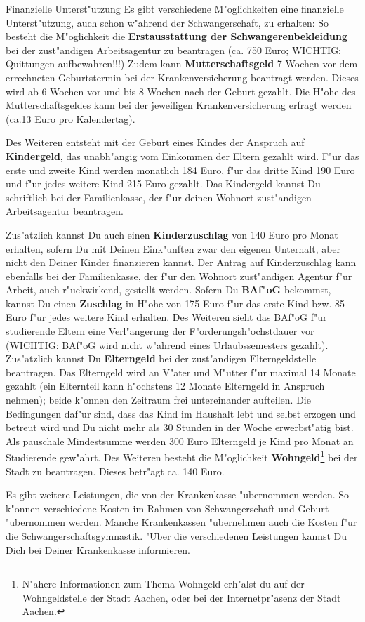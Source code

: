 \begin{artikel}{Finanzielle Unterst"utzung}
Es gibt verschiedene M"oglichkeiten eine finanzielle Unterst"utzung, auch schon w"ahrend der Schwangerschaft, zu erhalten:
So besteht die M"oglichkeit die \textbf{Erstausstattung der Schwangerenbekleidung} bei der zust"andigen Arbeitsagentur zu beantragen (ca. 750 Euro;  WICHTIG: Quittungen aufbewahren!!!)
Zudem kann \textbf{Mutterschaftsgeld} 7 Wochen vor dem errechneten Geburtstermin bei der Krankenversicherung beantragt werden. Dieses wird ab 6 Wochen vor und bis 8 Wochen nach der Geburt gezahlt. Die H"ohe des Mutterschaftsgeldes kann bei der jeweiligen Krankenversicherung erfragt werden (ca.13 Euro pro Kalendertag).

Des Weiteren entsteht  mit der Geburt eines Kindes der Anspruch auf \textbf{Kindergeld}, das unabh"angig vom Einkommen der Eltern gezahlt wird. F"ur das erste und zweite Kind werden monatlich 184 Euro, f"ur das dritte Kind 190 Euro und f"ur jedes weitere Kind 215 Euro gezahlt. Das Kindergeld kannst Du schriftlich bei der Familienkasse, der f"ur deinen Wohnort zust"andigen Arbeitsagentur beantragen.

Zus"atzlich kannst Du auch einen \textbf{Kinderzuschlag} von 140 Euro pro Monat erhalten, sofern Du mit Deinen Eink"unften zwar den eigenen Unterhalt, aber nicht den Deiner Kinder finanzieren kannst. Der Antrag auf Kinderzuschlag kann ebenfalls bei der Familienkasse, der f"ur den Wohnort zust"andigen Agentur f"ur Arbeit, auch r"uckwirkend, gestellt werden.
Sofern Du \textbf{BAf"oG} bekommst, kannst Du einen \textbf{Zuschlag} in H"ohe von 175 Euro f"ur das erste Kind bzw. 85 Euro f"ur jedes weitere Kind erhalten. Des Weiteren sieht das BAf"oG f"ur studierende Eltern eine Verl"angerung der F"orderungsh"ochstdauer vor (WICHTIG: BAf"oG wird nicht w"ahrend eines Urlaubssemesters gezahlt).\\

Zus"atzlich kannst Du \textbf{Elterngeld} bei der zust"andigen Elterngeldstelle beantragen. Das Elterngeld wird an V"ater und M"utter f"ur maximal 14 Monate gezahlt (ein Elternteil kann h"ochstens 12 Monate Elterngeld in Anspruch nehmen); beide k"onnen den Zeitraum frei untereinander aufteilen. Die Bedingungen daf"ur sind, dass das Kind im Haushalt lebt und selbst erzogen und betreut wird und Du nicht mehr als 30 Stunden in der Woche erwerbst"atig bist.  Als pauschale Mindestsumme werden 300 Euro Elterngeld je Kind  pro Monat an Studierende gew"ahrt. 
Des Weiteren besteht die M"oglichkeit \textbf{Wohngeld}\footnote{N"ahere Informationen zum Thema Wohngeld erh"alst du auf der Wohngeldstelle der Stadt Aachen, oder bei der Internetpr"asenz der Stadt  Aachen.} bei der Stadt zu beantragen. Dieses betr"agt ca. 140 Euro.


Es gibt weitere Leistungen, die von der Krankenkasse "ubernommen werden. So k"onnen verschiedene Kosten im Rahmen von Schwangerschaft und Geburt "ubernommen werden. Manche  Krankenkassen "ubernehmen auch die Kosten f"ur die Schwangerschaftsgymnastik. "Uber die verschiedenen Leistungen kannst Du Dich bei Deiner Krankenkasse informieren.
\end{artikel}
